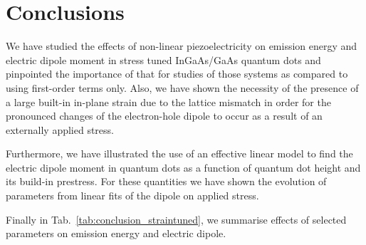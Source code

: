 %












\section*{Conclusions}
We have studied the effects of non-linear piezoelectricity on emission energy and electric dipole moment in stress tuned InGaAs/GaAs quantum dots and pinpointed the importance of that for studies of those systems as compared to using first-order terms only. 
Also, we have shown the necessity of the presence of a large built-in in-plane strain due to the lattice mismatch in order for the pronounced changes of the electron-hole dipole to occur as a result of an externally applied stress. 

Furthermore, we have illustrated the use of an effective linear model to find the electric dipole moment in quantum dots as a function of quantum dot height and its build-in prestress. For these quantities we have shown the evolution of parameters from linear fits of the dipole on applied stress. 

Finally in Tab.~\ref{tab:conclusion_straintuned}, we summarise effects of selected parameters on emission energy and electric dipole.


